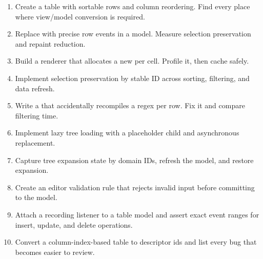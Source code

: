 \begin{exercisebox}
\begin{enumerate}
\item Create a table with sortable rows and column reordering. Find every place where view/model conversion is required.
\item Replace  with precise row events in a model. Measure selection preservation and repaint reduction.
\item Build a renderer that allocates a new  per cell. Profile it, then cache safely.
\item Implement selection preservation by stable ID across sorting, filtering, and data refresh.
\item Write a  that accidentally recompiles a regex per row. Fix it and compare filtering time.
\item Implement lazy tree loading with a placeholder child and asynchronous replacement.
\item Capture tree expansion state by domain IDs, refresh the model, and restore expansion.
\item Create an editor validation rule that rejects invalid input before committing to the model.
\item Attach a recording listener to a table model and assert exact event ranges for insert, update, and delete operations.
\item Convert a column-index-based table to descriptor ids and list every bug that becomes easier to review.
\end{enumerate}
\end{exercisebox}

